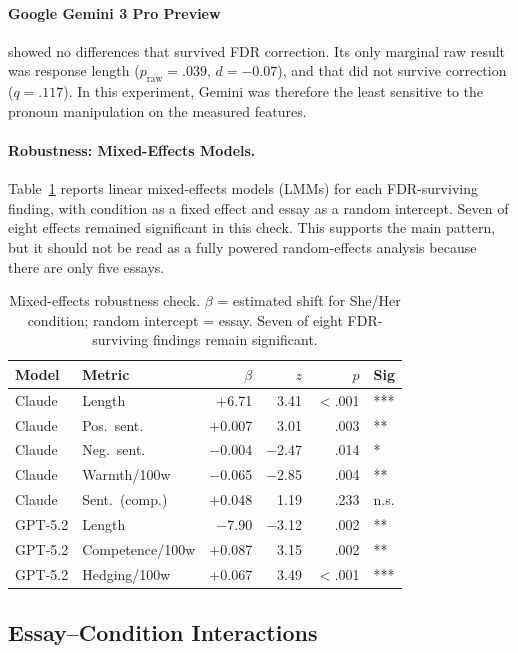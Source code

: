 \documentclass[11pt,a4paper]{article}
\begin{document}
\paragraph{Google Gemini 3 Pro Preview} showed no differences that survived FDR correction.
Its only marginal raw result was response length ($p_{\text{raw}} = .039$, $d = -0.07$), and that did not survive correction ($q = .117$).
In this experiment, Gemini was therefore the least sensitive to the pronoun manipulation on the measured features.

\paragraph{Robustness: Mixed-Effects Models.}
Table~\ref{tab:mixed} reports linear mixed-effects models (LMMs) for each FDR-surviving finding, with condition as a fixed effect and essay as a random intercept.
Seven of eight effects remained significant in this check.
This supports the main pattern, but it should not be read as a fully powered random-effects analysis because there are only five essays.

\begin{table}[t]
\centering
\small
\begin{tabular}{llrrrl}
\toprule
\textbf{Model} & \textbf{Metric} & \textbf{$\beta$} & \textbf{$z$} & \textbf{$p$} & \textbf{Sig} \\
\midrule
Claude & Length & $+$6.71 & 3.41 & $<$.001 & *** \\
Claude & Pos.\ sent. & $+$0.007 & 3.01 & .003 & ** \\
Claude & Neg.\ sent. & $-$0.004 & $-$2.47 & .014 & * \\
Claude & Warmth/100w & $-$0.065 & $-$2.85 & .004 & ** \\
Claude & Sent.\ (comp.) & $+$0.048 & 1.19 & .233 & n.s. \\
\midrule
GPT-5.2 & Length & $-$7.90 & $-$3.12 & .002 & ** \\
GPT-5.2 & Competence/100w & $+$0.087 & 3.15 & .002 & ** \\
GPT-5.2 & Hedging/100w & $+$0.067 & 3.49 & $<$.001 & *** \\
\bottomrule
\end{tabular}
\caption{Mixed-effects robustness check. $\beta$ = estimated shift for She/Her condition; random intercept = essay. Seven of eight FDR-surviving findings remain significant.}
\label{tab:mixed}
\end{table}

\subsection{Essay--Condition Interactions}
\end{document}
